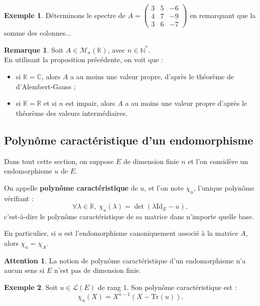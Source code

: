 \documentclass[french]{article}
\newcommand{\N}{\mathbb{N}}
\newcommand{\R}{\mathbb{R}}
\newcommand{\C}{\mathbb{C}}
\newcommand{\K}{\mathbb{K}}
\newcommand{\st}{^*}
\newcommand{\Tr}{\text{Tr}}
\newcommand{\Id}{\text{Id}}
\theoremstyle{plain}
\theoremstyle{definition}
\newtheorem*{ex}{Exemple}
\newtheorem*{rmq}{Remarque}
\newtheorem*{attention}{Attention}
\theoremstyle{remark}
\begin{document}
	\begin{ex}
		Déterminons le spectre de $A=\begin{pmatrix}
			3&5&-6\\
			4&7&-9\\
			3&6&-7
		\end{pmatrix}$ en remarquant que la somme des colonnes...
	\end{ex}
	
	\begin{rmq}
		Soit $A\in\mathcal{M}_n(\K)$, avec $n\in\N\st$.\\
		En utilisant la proposition précédente, on voit que :
		\begin{itemize}
			\item si $\K=\C$, alors $A$ a au moins une valeur propre, d'après le théorème de d'Alembert-Gauss ;
			\item si $\K=\R$ et si $n$ est impair, alors $A$ a au moins une valeur propre d'après le théorème des valeurs intermédiaires.
		\end{itemize}
	\end{rmq}
	
	\subsection{Polynôme caractéristique d'un endomorphisme}
	
	Dans tout cette section, on suppose $E$ de dimension finie $n$ et l'on considère un endomorphisme $u$ de $E$.
	
	\begin{dfn}
		On appelle \textbf{polynôme caractéristique} de $u$, et l'on note $\chi_u$, l'unique polynôme vérifiant : $$\forall \lambda\in\K,\ \chi_u(\lambda)=\det(\lambda\Id_E-u),$$c'est-à-dire le polynôme caractéristique de sa matrice dans n'importe quelle base. 
	\end{dfn}
	
	En particulier, si $u$ est l'endomorphisme canoniquement associé à la matrice $A$, alors $\chi_u=\chi_A$.
	
	\begin{attention}
		La notion de polynôme caractéristique d'un endomorphisme n'a aucun sens si $E$ n'est pas de dimension finie.
	\end{attention}
	
	\begin{ex}
		Soit $u\in\mathcal{L}(E)$ de rang $1$. Son polynôme caractéristique est : $$\chi_u(X)=X^{n-1}(X-\Tr(u)).$$
	\end{ex}
	
\end{document}
